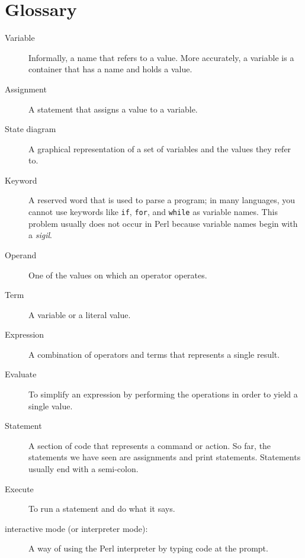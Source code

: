\section{Glossary}

\begin{description}

\item[Variable]  Informally, a name that refers to a value. More 
accurately, a variable is a container that has a name and holds a value.

\item[Assignment]  A statement that assigns a value to a variable.

\item[State diagram]  A graphical representation of a set of variables and the
values they refer to.

\item[Keyword]  A reserved word that is used to parse a
program; in many languages, you cannot use keywords like 
{\tt if}, {\tt  for}, and {\tt while} as variable names. 
This problem usually does not occur in Perl because variable
names begin with a \emph{sigil}.

\item[Operand]  One of the values on which an operator operates.

\item[Term]  A variable or a literal value.

\item[Expression]  A combination of operators and terms that
represents a single result.

\item[Evaluate]  To simplify an expression by performing the operations
in order to yield a single value.

\item[Statement]  A section of code that represents a command or action.  So
far, the statements we have seen are assignments and print statements. Statements usually end with a semi-colon.

\item[Execute]  To run a statement and do what it says.

\item[interactive mode (or interpreter mode):] A way of using the Perl 
interpreter by typing code at the prompt.


\end{description}
